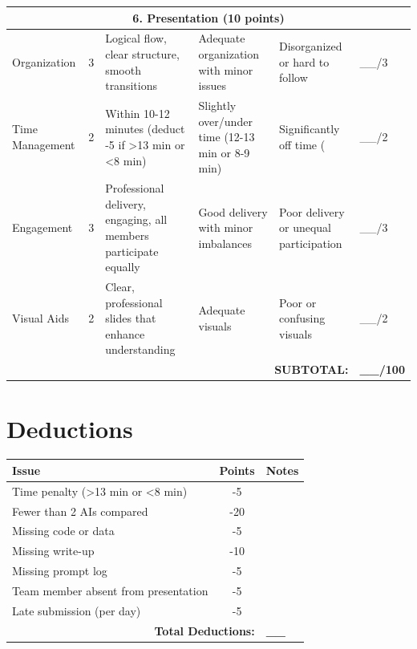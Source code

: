 \documentclass[11pt]{article}
\begin{document}
\begin{longtable}{|p{3cm}|p{1.2cm}|p{3.5cm}|p{3.5cm}|p{3.5cm}|p{1.2cm}|}
\multicolumn{6}{|c|}{\textbf{6. Presentation (10 points)}} \\
\hline

Organization & 3 &
Logical flow, clear structure, smooth transitions &
Adequate organization with minor issues &
Disorganized or hard to follow &
\_\_/3 \\
\hline

Time Management & 2 &
Within 10-12 minutes (deduct -5 if >13 min or <8 min) &
Slightly over/under time (12-13 min or 8-9 min) &
Significantly off time (&
\_\_/2 \\
\hline

Engagement & 3 &
Professional delivery, engaging, all members participate equally &
Good delivery with minor imbalances &
Poor delivery or unequal participation &
\_\_/3 \\
\hline

Visual Aids & 2 &
Clear, professional slides that enhance understanding &
Adequate visuals &
Poor or confusing visuals &
\_\_/2 \\
\hline

\multicolumn{5}{|r|}{\textbf{SUBTOTAL:}} & \textbf{\_\_/100} \\
\hline

\end{longtable}

\section*{Deductions}

\begin{tabular}{|l|c|l|}
\hline
\textbf{Issue} & \textbf{Points} & \textbf{Notes} \\
\hline
Time penalty (>13 min or <8 min) & -5 & \\
\hline
Fewer than 2 AIs compared & -20 & \\
\hline
Missing code or data & -5 & \\
\hline
Missing write-up & -10 & \\
\hline
Missing prompt log & -5 & \\
\hline
Team member absent from presentation & -5 & \\
\hline
Late submission (per day) & -5 & \\
\hline
\multicolumn{2}{|r|}{\textbf{Total Deductions:}} & \textbf{\_\_} \\
\hline
\end{tabular}

\vspace{1em}
\end{document}
